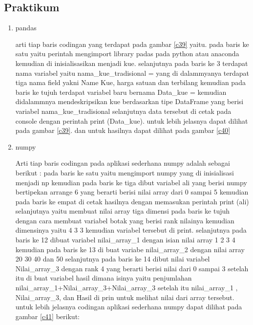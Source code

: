 \subsection{Praktikum}
\begin{enumerate}
\item pandas \par
arti tiap baris codingan yang terdapat pada gambar \ref{c39} yaitu. pada baris ke satu yaitu perintah mengimport library padas pada python atau anaconda kemudian di inisialisasikan menjadi kue. selanjutnya pada baris ke 3 terdapat nama variabel yaitu nama\_kue\_tradisional = yang di dalammyanya terdapat tiga nama field yakni Name Kue, harga satuan dan terbilang kemudian pada baris ke tujuh terdapat variabel baru bernama Data\_kue = kemudian didalammnya mendeskripsikan kue berdasarkan tipe DataFrame yang berisi variabel nama\_kue\_tradisional selanjutnya data tersebut di cetak pada console dengan perintah print (Data\_kue). untuk lebih jelasnya dapat dilihat pada gambar \ref{c39}. dan untuk hasilnya dapat dilihat pada gambar \ref{c40}

\item numpy\par
Arti tiap baris codingan pada aplikasi sederhana numpy adalah sebagai berikut : pada baris ke satu yaitu mengimport numpy yang di inisialisasi menjadi np kemudian pada baris ke tiga dibut variabel ali yang berisi numpy bertipekan arrange 6 yang berarti berisi nilai array dari 0 sampai 5 kemudian pada baris ke empat di cetak hasilnya dengan memasukan perintah print (ali) selanjutnya yaitu membuat nilai array tiga dimensi pada baris ke tujuh dengan cara membuat variabel botak yang berisi rank nilainya kemudian dimensinya yaitu 4 3 3 kemudian variabel tersebut di print. selanjutnya pada baris ke 12 dibuat variabel nilai\_array\_1 dengan isian nilai array 1 2 3 4 kemudian pada baris ke 13 di buat variabe nilai\_array\_2 dengan nilai array 20 30 40 dan 50 selanjutnya pada baris ke 14 dibut nilai variabel Nilai\_array\_3 dengan rank 4 yang berarti berisi nilai dari 0 sampai 3 setelah itu di buat variabel hasil dimana isinya yaitu penjumlahan nilai\_array\_1+Nilai\_array\_3+Nilai\_array\_3 setelah itu nilai\_array\_1 , Nilai\_array\_3, dan Hasil di prin untuk melihat nilai dari array tersebut. untuk lebih jelasnya codingan aplikasi sederhana numpy dapat dilihat pada gambar \ref{c41} berikut:


\end{enumerate}

